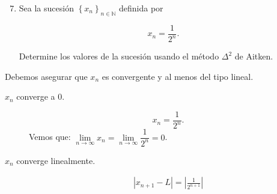 \documentclass[
	spanish,
	8pt,
	utf8,
	xcolor=table,
	handout,
	aspectratio=169,
	professionalfonts,
	mathserif,
	leqno,
]{beamer}
\begin{document}
\begin{frame}
	\begin{enumerate}\setcounter{enumi}{6}
		\item

		      Sea la sucesión $\left\{x_{n}\right\}_{n\in\mathbb{N}}$
		      definida por

		      \begin{equation*}
			      x_{n}=\frac{1}{2^{n}}.
		      \end{equation*}

		      Determine los valores de la sucesión usando el método
		      $\Delta^{2}$ de Aitken.

	\end{enumerate}

	\begin{solution}
		Debemos asegurar que $x_{n}$ es convergente y al menos del tipo lineal.
		\begin{description}
			\item[$x_{n}$ converge a $0$.]

				\begin{equation*}
					x_{n}=\frac{1}{2^{n}}.
				\end{equation*}
				Vemos que:
				\begin{math}
					\lim\limits_{n\to\infty}
					{
						x_{n}
					}=\lim\limits_{n\to\infty}
					\dfrac{
						{1}
					}{
						{{2^{n}}}
					}=0
				\end{math}.


			\item[$x_{n}$ converge linealmente.]

				\begin{align*}
					\left|x_{n+1}-L\right| =
					\left|\frac{1}{2^{n+1}}\right|
				\end{align*}


\end{description}
\end{solution}
\end{frame}
\end{document}
